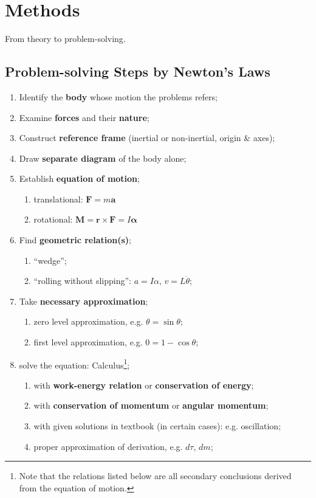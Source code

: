 \documentclass[11pt, a4paper, oneside]{book}
\numberwithin{equation}{section}%
\begin{document}


\chapter{Methods}

From theory to problem-solving.

\section{Problem-solving Steps by Newton's Laws}
\begin{enumerate}
	\item Identify the \textbf{body} whose motion the problems refers;
	\item Examine \textbf{forces} and their \textbf{nature};
	\item Construct \textbf{reference frame} (inertial or non-inertial, origin \& axes);
	\item Draw \textbf{separate diagram} of the body alone;
	\item Establish \textbf{equation of motion};
	\begin{enumerate}
		\item translational: $\bm{F} = m\bm{a}$
		\item rotational: $ \bm{M} = \bm{r} \times \bm{F} = I\bm{\alpha} $
	\end{enumerate}
	\item Find \textbf{geometric relation(s)};
	\begin{enumerate}
		\item ``wedge'';
		\item ``rolling without slipping'': $ a = I\alpha $, $ v = L\dot{\theta} $;
	\end{enumerate}
	\item Take \textbf{necessary approximation};
		\begin{enumerate}
			\item zero level approximation, e.g. $ \theta = \sin\theta $;
			\item first level approximation, e.g. $ 0 = 1 - \cos\theta $;
		\end{enumerate}
	\item solve the equation: Calculus\footnote{Note that the relations listed below are all secondary conclusions derived from the equation of motion.};
	\begin{enumerate}
		\item with \textbf{work-energy relation} or \textbf{conservation of energy};
		\item with \textbf{conservation of momentum} or \textbf{angular momentum};
		\item with given solutions in textbook (in certain cases): e.g. oscillation;
		\item proper approximation of derivation, e.g. $d\tau$, $dm$;
	\end{enumerate} 
\end{enumerate}
\end{document}
